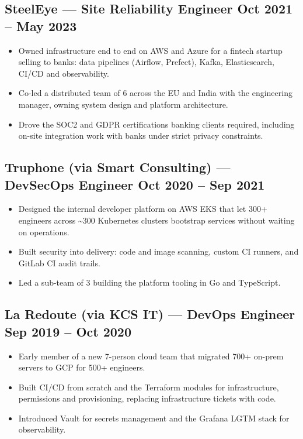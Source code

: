 \documentclass[a4paper,10pt]{article}
\begin{document}
\subsection*{SteelEye --- Site Reliability Engineer \hfill Oct 2021 -- May 2023}
\begin{itemize}
  \item Owned infrastructure end to end on AWS and Azure for a fintech startup selling to banks: data pipelines (Airflow, Prefect), Kafka, Elasticsearch, CI/CD and observability.
  \item Co-led a distributed team of 6 across the EU and India with the engineering manager, owning system design and platform architecture.
  \item Drove the SOC2 and GDPR certifications banking clients required, including on-site integration work with banks under strict privacy constraints.
\end{itemize}

\subsection*{Truphone (via Smart Consulting) --- DevSecOps Engineer \hfill Oct 2020 -- Sep 2021}
\begin{itemize}
  \item Designed the internal developer platform on AWS EKS that let 300+ engineers across \textasciitilde{}300 Kubernetes clusters bootstrap services without waiting on operations.
  \item Built security into delivery: code and image scanning, custom CI runners, and GitLab CI audit trails.
  \item Led a sub-team of 3 building the platform tooling in Go and TypeScript.
\end{itemize}

\subsection*{La Redoute (via KCS IT) --- DevOps Engineer \hfill Sep 2019 -- Oct 2020}
\begin{itemize}
  \item Early member of a new 7-person cloud team that migrated 700+ on-prem servers to GCP for 500+ engineers.
  \item Built CI/CD from scratch and the Terraform modules for infrastructure, permissions and provisioning, replacing infrastructure tickets with code.
  \item Introduced Vault for secrets management and the Grafana LGTM stack for observability.
\end{itemize}
\end{document}
